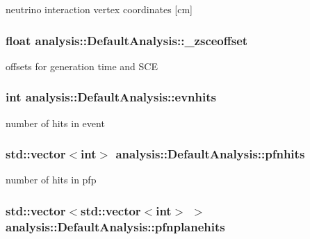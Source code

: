 neutrino interaction vertex coordinates \mbox{[}cm\mbox{]} \hypertarget{classanalysis_1_1DefaultAnalysis_af2471e0f1bf6cf3c5bec18f830f41c8d}{
\subsubsection[{\-\_\-zsceoffset}]{\setlength{\rightskip}{0pt plus 5cm}float analysis\-::\-Default\-Analysis\-::\-\_\-zsceoffset\hspace{0.3cm}{\ttfamily [private]}}}\label{classanalysis_1_1DefaultAnalysis_af2471e0f1bf6cf3c5bec18f830f41c8d}
offsets for generation time and S\-C\-E \hypertarget{classanalysis_1_1DefaultAnalysis_a32911aea589477a3832a4de8d134696d}{
\subsubsection[{evnhits}]{\setlength{\rightskip}{0pt plus 5cm}int analysis\-::\-Default\-Analysis\-::evnhits\hspace{0.3cm}{\ttfamily [private]}}}\label{classanalysis_1_1DefaultAnalysis_a32911aea589477a3832a4de8d134696d}
number of hits in event \hypertarget{classanalysis_1_1DefaultAnalysis_a8d010c569e35c153059a6db573b9542d}{
\subsubsection[{pfnhits}]{\setlength{\rightskip}{0pt plus 5cm}std\-::vector$<$int$>$ analysis\-::\-Default\-Analysis\-::pfnhits\hspace{0.3cm}{\ttfamily [private]}}}\label{classanalysis_1_1DefaultAnalysis_a8d010c569e35c153059a6db573b9542d}
number of hits in pfp \hypertarget{classanalysis_1_1DefaultAnalysis_a868edc3f02a7f71619edef7ee0d3df5c}{
\subsubsection[{pfnplanehits}]{\setlength{\rightskip}{0pt plus 5cm}std\-::vector$<$std\-::vector$<$int$>$ $>$ analysis\-::\-Default\-Analysis\-::pfnplanehits\hspace{0.3cm}{\ttfamily [private]}}}\label{classanalysis_1_1DefaultAnalysis_a868edc3f02a7f71619edef7ee0d3df5c}
